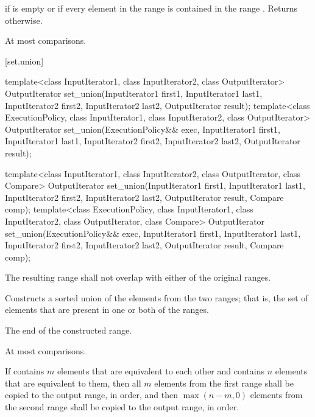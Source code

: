 \begin{itemdescr}
\pnum
\returns
{}
if  is empty or
if every element in the range
is contained in the range
.
Returns
otherwise.

\pnum
\complexity
At most
comparisons.
\end{itemdescr}

[set.union]{}

%
\begin{itemdecl}
template<class InputIterator1, class InputIterator2,
         class OutputIterator>
  OutputIterator
    set_union(InputIterator1 first1, InputIterator1 last1,
              InputIterator2 first2, InputIterator2 last2,
              OutputIterator result);
template<class ExecutionPolicy, class InputIterator1, class InputIterator2,
         class OutputIterator>
  OutputIterator
    set_union(ExecutionPolicy&& exec,
              InputIterator1 first1, InputIterator1 last1,
              InputIterator2 first2, InputIterator2 last2,
              OutputIterator result);

template<class InputIterator1, class InputIterator2,
         class OutputIterator, class Compare>
  OutputIterator
    set_union(InputIterator1 first1, InputIterator1 last1,
              InputIterator2 first2, InputIterator2 last2,
              OutputIterator result, Compare comp);
template<class ExecutionPolicy, class InputIterator1, class InputIterator2,
         class OutputIterator, class Compare>
  OutputIterator
    set_union(ExecutionPolicy&& exec,
              InputIterator1 first1, InputIterator1 last1,
              InputIterator2 first2, InputIterator2 last2,
              OutputIterator result, Compare comp);
\end{itemdecl}

\begin{itemdescr}
\pnum
\requires
The resulting range shall not overlap with either of the original ranges.

\pnum
\effects
Constructs a sorted union of the elements from the two ranges;
that is, the set of elements that are present in one or both of the ranges.

\pnum
\returns
The end of the constructed range.

\pnum
\complexity
At most
comparisons.

\pnum
\remarks If  contains $m$ elements that are equivalent to
each other and  contains $n$ elements that are equivalent
to them, then all $m$ elements from the first range shall be copied to the output
range, in order, and then $\max(n - m, 0)$ elements from the second range shall
be copied to the output range, in order.
\end{itemdescr}

